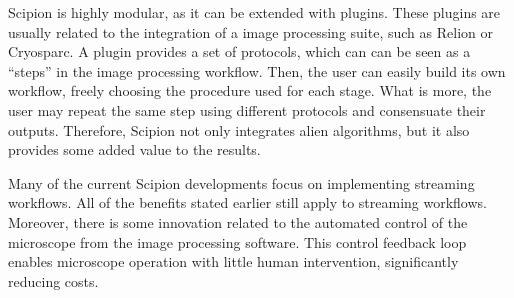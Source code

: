 \documentclass[../main.tex]{subfiles}
\begin{document}
Scipion is highly modular, as it can be extended with plugins. These plugins are usually related to the integration of a image processing suite, such as Relion or Cryosparc. A plugin provides a set of protocols, which can can be seen as a ``steps'' in the image processing workflow. Then, the user can easily build its own workflow, freely choosing the procedure used for each stage. What is more, the user may repeat the same step using different protocols and consensuate their outputs. Therefore, Scipion not only integrates alien algorithms, but it also provides some added value to the results.

Many of the current Scipion developments focus on implementing streaming workflows. All of the benefits stated earlier still apply to streaming workflows. Moreover, there is some innovation related to the automated control of the microscope from the image processing software. This control feedback loop enables microscope operation with little human intervention, significantly reducing costs.
\end{document}
